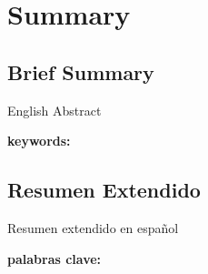 
\newpage



\chapter*{Summary}
\section*{Brief Summary}

English Abstract

\textbf{keywords:} 



\section*{Resumen Extendido}

Resumen extendido en español

\textbf{palabras clave:} 




